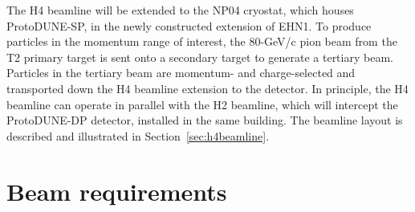 The H4 beamline will be extended to the NP04 cryostat, which houses ProtoDUNE-SP,  in the newly constructed extension of EHN1. To produce particles in the momentum range of interest, the 80-GeV/c pion beam from the T2 primary target is sent onto a secondary target to generate a tertiary beam. Particles in the tertiary beam are momentum- and charge-selected and transported down the H4 beamline extension to the detector. %
In principle, the H4 beamline can operate in parallel with the H2 beamline, which will intercept the ProtoDUNE-DP detector, installed in the same building. The beamline layout is described and illustrated in Section~\ref{sec:h4beamline}. %

\section{Beam requirements}
\label{sec:beamrequirements}


